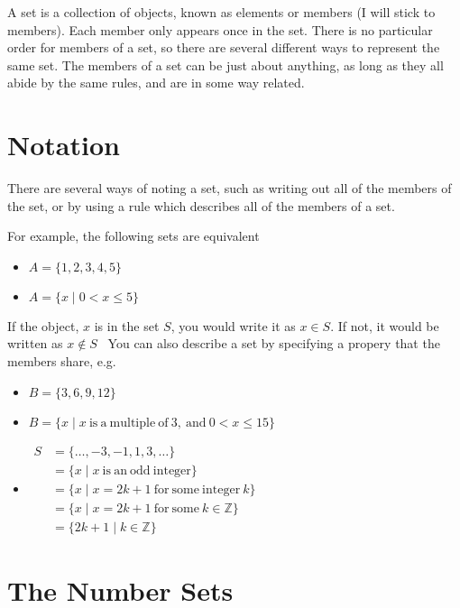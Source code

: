 
A set is a collection of objects, known as elements or members (I will stick to members). Each member only appears once
 in the set. There is no particular order for members of a set, so there are several different ways to represent the
 same set. The members of a set can be just about anything, as long as they all abide by the same rules, and are in
 some way related.

\section*{Notation}

There are several ways of noting a set, such as writing out all of the members of the set, or by using a rule which
 describes all of the members of a set.

For example, the following sets are equivalent
\begin{itemize}
  \item $A = \{1, 2, 3, 4, 5\}$
  \item $A = \{x \mid 0 < x \leq 5\}$
\end{itemize}

If the object, $x$ is in the set $S$, you would write it as $x \in S$. If not, it would be written as $x \notin S$ \
You can also describe a set by specifying a propery that the members share, e.g.
\begin{itemize}
  \item $B = \{3, 6, 9, 12\}$
  \item $B = \{x \mid x \mathrm{\ is\ a\ multiple\ of\ } 3 \mathrm{,\ and\ } 0 < x \leq 15\}$
  \item $\begin{aligned}
    S &= \{\dots, -3, -1, 1, 3, \dots\} \\
    & = \{x \mid x \mathrm{\ is\ an\ odd\ integer}\} \\
    & = \{x \mid x = 2k + 1 \mathrm{\ for\ some\ integer\ } k\} \\
    & = \{x \mid x = 2k + 1 \mathrm{\ for\ some\ } k \in \mathbb{Z}\} \\
    & = \{2k + 1 \mid k \in \mathbb{Z}\}
  \end{aligned}$
\end{itemize}

\section*{The Number Sets}

